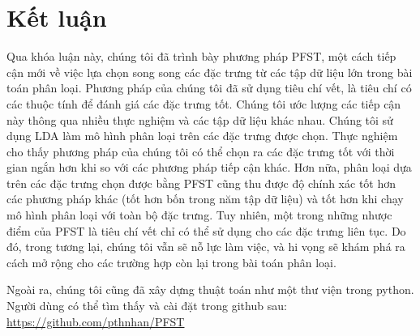 \chapter*{Kết luận}
Qua khóa luận này, chúng tôi đã trình bày phương pháp PFST, một cách tiếp cận mới về việc lựa chọn song song các đặc trưng từ các tập dữ liệu lớn trong bài toán phân loại. Phương pháp của chúng tôi đã sử dụng tiêu chí vết, là tiêu chí có các thuộc tính để đánh giá các đặc trưng tốt. Chúng tôi ước lượng các tiếp cận này thông qua nhiều thực nghiệm và các tập dữ liệu khác nhau. Chúng tôi sử dụng LDA làm mô hình phân loại trên các đặc trưng được chọn. Thực nghiệm cho thấy phương pháp của chúng tôi có thể chọn ra các đặc trưng tốt với thời gian ngắn hơn khi so với các phương pháp tiếp cận khác. Hơn nữa, phân loại dựa trên các đặc trưng chọn được bằng PFST cũng thu được độ chính xác tốt hơn các phương pháp khác (tốt hơn bốn trong năm tập dữ liệu) và tốt hơn khi chạy mô hình phân loại với toàn bộ đặc trưng. Tuy nhiên, một trong những nhược điểm của PFST là tiêu chí vết chỉ có thể sử dụng cho các đặc trưng liên tục. Do đó, trong tương lại, chúng tôi vẫn sẽ nỗ lực làm việc, và hi vọng sẽ khám phá ra cách mở rộng cho các trường hợp còn lại trong bài toán phân loại.

Ngoài ra, chúng tôi cũng đã xây dựng thuật toán như một thư viện trong python. Người dùng có thể tìm thấy và cài đặt trong github sau: \url{https://github.com/pthnhan/PFST}